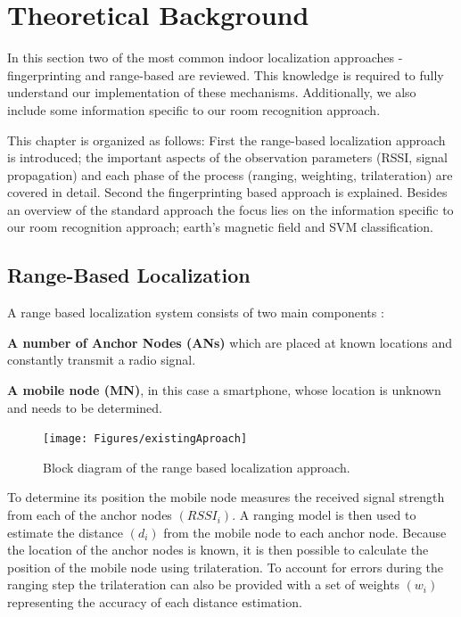 
\chapter{Theoretical Background} %

\label{Chapter2} %

In this section two of the most common indoor localization approaches - fingerprinting and range-based are reviewed. This knowledge is required to fully understand our implementation of these mechanisms. Additionally, we also include some information specific to our room recognition approach. 

This chapter is organized as follows: First the range-based localization approach is introduced; the important aspects of the observation parameters (RSSI, signal propagation) and each phase of the process (ranging, weighting, trilateration) are covered in detail. Second the fingerprinting based approach is explained. Besides an overview of the standard approach the focus lies on the information specific to our room recognition approach; earth's magnetic field and SVM classification.

\section{Range-Based Localization}
\label{therory:range-based}

A range based localization system consists of two main components \citep{surveyIndoorTechniques}:

\textbf{A number of Anchor Nodes (ANs)} which are placed at known locations and constantly transmit a radio signal.

\textbf{A mobile node (MN)}, in this case a smartphone, whose location is unknown and needs to be determined.

\begin{figure}[ht]
\centering
\texttt{[image: Figures/existingAproach]}
\decoRule
\caption[Range-based localization approach]{Block diagram of the range based localization approach.}
\label{fig:existingApproach}
\end{figure}

To determine its position the mobile node measures the received signal strength from each of the anchor nodes $(RSSI_i)$. A ranging model is then used to estimate the distance $(d_i)$ from the mobile node to each anchor node. Because the location of the anchor nodes is known, it is then possible to calculate the position of the mobile node using trilateration. To account for errors during the ranging step the trilateration can also be provided with a set of weights $(w_i)$ representing the accuracy of each distance estimation.

